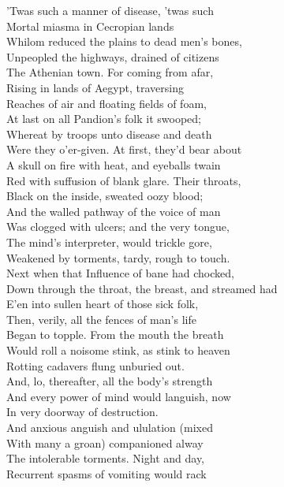 'Twas such a manner of disease, 'twas such\\
Mortal miasma in Cecropian lands\\
Whilom reduced the plains to dead men's bones,\\
Unpeopled the highways, drained of citizens\\
The Athenian town. For coming from afar,\\
Rising in lands of Aegypt, traversing\\
Reaches of air and floating fields of foam,\\
At last on all Pandion's folk it swooped;\\
Whereat by troops unto disease and death\\
Were they o'er-given. At first, they'd bear about\\
A skull on fire with heat, and eyeballs twain\\
Red with suffusion of blank glare. Their throats,\\
Black on the inside, sweated oozy blood;\\
And the walled pathway of the voice of man\\
Was clogged with ulcers; and the very tongue,\\
The mind's interpreter, would trickle gore,\\
Weakened by torments, tardy, rough to touch.\\
Next when that Influence of bane had chocked,\\
Down through the throat, the breast, and streamed had\\
E'en into sullen heart of those sick folk,\\
Then, verily, all the fences of man's life\\
Began to topple. From the mouth the breath\\
Would roll a noisome stink, as stink to heaven\\
Rotting cadavers flung unburied out.\\
And, lo, thereafter, all the body's strength\\
And every power of mind would languish, now\\
In very doorway of destruction.\\
And anxious anguish and ululation (mixed\\
With many a groan) companioned alway\\
The intolerable torments. Night and day,\\
Recurrent spasms of vomiting would rack\\
